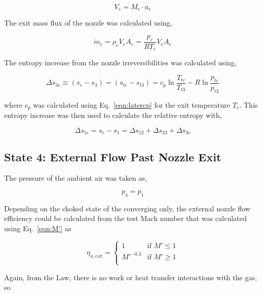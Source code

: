 \documentclass[conf]{new-aiaa} %
\begin{document}
\begin{equation}
    \label{eqn:Ve}
    V_e=M_e\cdot a_e
\end{equation}

The exit mass flux of the nozzle was calculated using,

\begin{equation}
    \label{eqn:mdote}
    \dot{m}_e=\rho_e V_e A_e=\frac{p_e}{R T_e}V_e A_e
\end{equation}

The entropy increase from the nozzle irreversibilities was calculated using,

\begin{equation}
    \label{eqn:dels3e}
    \Delta s_{3e}\equiv\left(s_e-s_3\right)=\left(s_{te}-s_{t3}\right)=c_p \ln\frac{T_{te}}{T_{t3}}-R\ln\frac{p_{te}}{p_{t3}}
\end{equation}

where $c_p$ was calculated using Eq.~\eqref{eqn:latercp} for the exit temperature $T_e$. This entropy increase was then used to calculate the relative entropy with,

\begin{equation}
    \label{eqn:dels1e}
    \Delta s_{1e}=s_e-s_1=\Delta s_{12}+\Delta s_{23}+\Delta s_{3e}
\end{equation}

\subsection{State 4: External Flow Past Nozzle Exit}
The pressure of the ambient air was taken as,

\begin{equation}
    \label{eqn:p4}
    p_4=p_1
\end{equation}

Depending on the choked state of the converging only, the external nozzle flow efficiency could be calculated from the test Mach number that was calculated using Eq.~\eqref{eqn:M'} as

\begin{equation}
    \label{eqn:eta_n_ext}
    \eta_{n,ext} = \begin{cases}
        1 & \text{if } M' \leq 1 \\
        M'^{-0.3} & \text{if } M' \geq 1 \\
    \end{cases}
\end{equation}

Again, from the  Law, there is no work or heat transfer interactions with the gas, so
\end{document}

